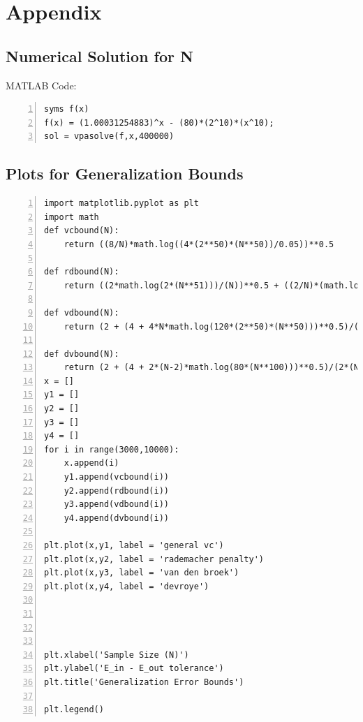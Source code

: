 \documentclass{article}
\begin{document}
\section*{Appendix}
\subsection{\label{prob1}Numerical Solution for N}
MATLAB Code:
\begin{lstlisting}[frame=single,
numbers=left,
style=Matlab-Pyglike]
syms f(x)
f(x) = (1.00031254883)^x - (80)*(2^10)*(x^10);
sol = vpasolve(f,x,400000)
\end{lstlisting}
\newpage
\subsection{\label{prob2}Plots for Generalization Bounds}
\begin{lstlisting}[frame=single,
numbers=left,
style=Matlab-Pyglike]
import matplotlib.pyplot as plt
import math
def vcbound(N):
    return ((8/N)*math.log((4*(2**50)*(N**50))/0.05))**0.5

def rdbound(N):
    return ((2*math.log(2*(N**51)))/(N))**0.5 + ((2/N)*(math.log((1)/(0.05))))*0.5 + 1/N

def vdbound(N):
    return (2 + (4 + 4*N*math.log(120*(2**50)*(N**50)))**0.5)/(2*N)

def dvbound(N):
    return (2 + (4 + 2*(N-2)*math.log(80*(N**100)))**0.5)/(2*(N-2))
x = []
y1 = []
y2 = []
y3 = []
y4 = []
for i in range(3000,10000):
    x.append(i)
    y1.append(vcbound(i))
    y2.append(rdbound(i))
    y3.append(vdbound(i))
    y4.append(dvbound(i))

plt.plot(x,y1, label = 'general vc')
plt.plot(x,y2, label = 'rademacher penalty')
plt.plot(x,y3, label = 'van den broek')
plt.plot(x,y4, label = 'devroye')




plt.xlabel('Sample Size (N)')
plt.ylabel('E_in - E_out tolerance')
plt.title('Generalization Error Bounds')

plt.legend()
\end{lstlisting}
\end{document}
